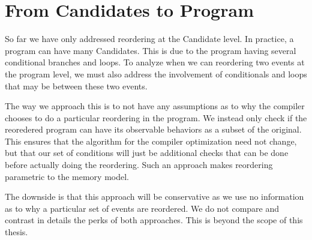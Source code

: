 \section{From Candidates to Program}

    So far we have only addressed reordering at the Candidate level. In practice, a program can have many Candidates. This is due to the program having several conditional branches and loops. To analyze when we can reordering two events at the program level, we must also address the involvement of conditionals and loops that may be between these two events.
    
    The way we approach this is to not have any assumptions as to why the compiler chooses to do a particular reordering in the program. 
    We instead only check if the reoredered program can have its observable behaviors as a subset of the original. This ensures that the algorithm for the compiler optimization need not change, but that our set of conditions will just be additional checks that can be done before actually doing the reordering. Such an approach makes reordering parametric to the memory model. 

    The downside is that this approach will be conservative as we use no information as to why a particular set of events are reordered. We do not compare and contrast in details the perks of both approaches. This is beyond the scope of this thesis.
    
    

    